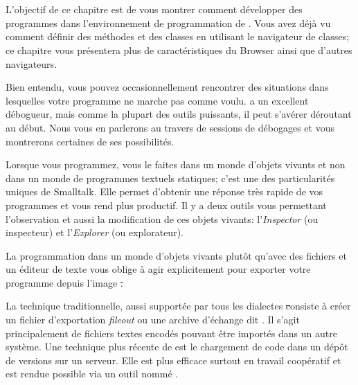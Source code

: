 \documentclass[a4paper,10pt,twoside]{book}
\begin{document}
	\sloppy
\fi

\chapter{\titreEnvironment}



L'objectif de ce chapitre est de vous montrer comment développer des programmes 
dans l'environnement de programmation de \pharo.
Vous avez déjà vu comment définir des méthodes et des classes
en utilisant le navigateur de classes; ce chapitre
vous présentera plus de caractéristiques du Browser ainsi que
d'autres navigateurs. %

Bien entendu, vous pouvez occasionnellement rencontrer
des situations dans lesquelles votre programme ne marche pas comme voulu.
\pharo a un excellent débogueur, mais comme la plupart des outils puissants, il peut s'avérer déroutant au début.
Nous vous en parlerons au travers de sessions de débogages et vous
montrerons certaines de ses possibilités.

Lorsque vous programmez, vous le faites dans un monde d'objets vivants et
non dans un monde de programmes textuels statiques; c'est 
une des particularités uniques de Smalltalk.
Elle permet d'obtenir une réponse très rapide de vos programmes et vous rend plus productif. 
Il y a deux outils vous permettant l'observation et aussi la modification de ces objets 
vivants: l'\emph{Inspector} (ou inspecteur) et l'\emph{Explorer} (ou explorateur).

La programmation dans un monde d'objets vivants plutôt qu'avec des fichiers et un éditeur 
de texte vous oblige à agir explicitement pour exporter votre programme depuis l'image \st.

La technique traditionnelle, aussi supportée par tous les dialectes \st consiste à créer un 
fichier d'exportation \emph{fileout} ou une archive d'échange dit \changeset. Il s'agit 
principalement de fichiers textes encodés pouvant être importés dans un autre système.
Une technique plus récente de \pharo est le chargement de code dans un dépôt de versions sur un serveur.
Elle est plus efficace surtout en travail coopératif et est rendue possible via un outil nommé .
\end{document}
